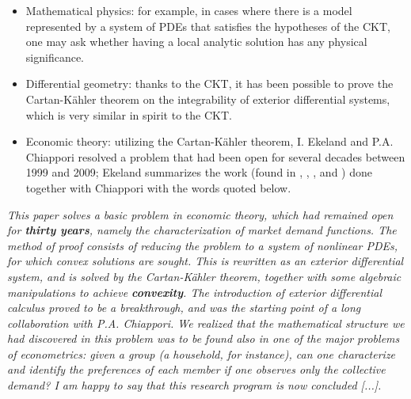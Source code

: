 \begin{itemize}
\item Mathematical physics: for example, in cases where there is a model represented by a system of PDEs that satisfies the hypotheses of the CKT, one may ask whether having a local analytic solution has any physical significance.
\item Differential geometry: thanks to the CKT, it has been possible to prove the Cartan-Kähler theorem on the integrability of exterior differential systems, which is very similar in spirit to the CKT.
\item Economic theory: utilizing the Cartan-Kähler theorem, I. Ekeland and P.A. Chiappori resolved a problem that had been open for several decades between 1999 and 2009; Ekeland summarizes the work (found in \cite{CE}, \cite{CEgenchar}, \cite{CEaggregation}, and \cite{CEid}) done together with Chiappori with the words quoted below.
\end{itemize}

\textit{This paper solves a basic problem in economic theory, which had remained open for \textbf{thirty years}, namely the characterization of market demand functions. The method of proof consists of reducing the problem to a system of nonlinear PDEs, for which convex solutions are sought. This is rewritten as an exterior differential system, and is solved by the Cartan-Kähler theorem, together with some algebraic manipulations to achieve \textbf{convexity}. The introduction of exterior differential calculus proved to be a breakthrough, and was the starting point of a long collaboration with P.A. Chiappori. We realized that the mathematical structure we had discovered in this problem was to be found also in one of the major problems of econometrics: given a group (a household, for instance), can one characterize and identify the preferences of each member if one observes only the collective demand? I am happy to say that this research program is now concluded [...].}

\newpage
\blankpage